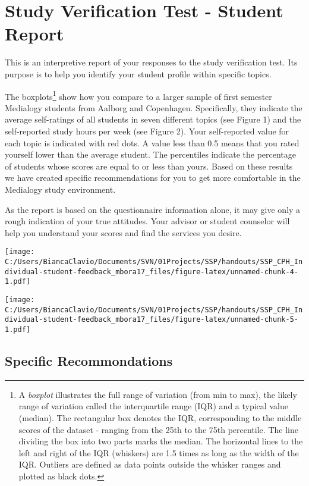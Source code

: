 \documentclass[]{article}
\title{}
\author{}
\date{}
\let\rmarkdownfootnote\footnote%
\def\footnote{\protect\rmarkdownfootnote}
\begin{document}
\section{Study Verification Test - Student
Report}\label{study-verification-test---student-report}

This is an interpretive report of your responses to the study
verification test. Its purpose is to help you identify your student
profile within specific topics.

The boxplots\footnote{A \emph{boxplot} illustrates the full range of
  variation (from min to max), the likely range of variation called the
  interquartile range (IQR) and a typical value (median). The
  rectangular box denotes the IQR, corresponding to the middle scores of
  the dataset - ranging from the 25th to the 75th percentile. The line
  dividing the box into two parts marks the median. The horizontal lines
  to the left and right of the IQR (whiskers) are 1.5 times as long as
  the width of the IQR. Outliers are defined as data points outside the
  whisker ranges and plotted as black dots.} show how you compare to a
larger sample of first semester Medialogy students from Aalborg and
Copenhagen. Specifically, they indicate the average self-ratings of all
students in seven different topics (see Figure 1) and the self-reported
study hours per week (see Figure 2). Your self-reported value for each
topic is indicated with red dots. A value less than 0.5 means that you
rated yourself lower than the average student. The percentiles indicate
the percentage of students whose scores are equal to or less than yours.
Based on these results we have created specific recommendations for you
to get more comfortable in the Medialogy study environment.

As the report is based on the questionnaire information alone, it may
give only a rough indication of your true attitudes. Your advisor or
student counselor will help you understand your scores and find the
services you desire.

\texttt{[image: C:/Users/BiancaClavio/Documents/SVN/01Projects/SSP/handouts/SSP\_CPH\_Individual-student-feedback\_mbora17\_files/figure-latex/unnamed-chunk-4-1.pdf]}

\texttt{[image: C:/Users/BiancaClavio/Documents/SVN/01Projects/SSP/handouts/SSP\_CPH\_Individual-student-feedback\_mbora17\_files/figure-latex/unnamed-chunk-5-1.pdf]}

\pagebreak

\subsection{Specific Recommondations}\label{specific-recommondations}
\end{document}
